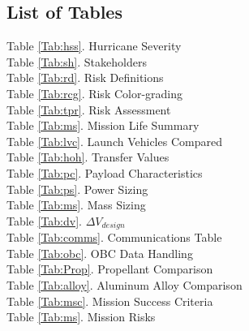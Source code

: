 \subsection{List of Tables}
Table \ref{Tab:hss}. Hurricane Severity\\
Table \ref{Tab:sh}. Stakeholders\\
Table \ref{Tab:rd}. Risk Definitions\\
Table \ref{Tab:rcg}. Risk Color-grading\\
Table \ref{Tab:tpr}. Risk Assessment\\
Table \ref{Tab:ms}. Mission Life Summary\\
Table \ref{Tab:lvc}. Launch Vehicles Compared\\
Table \ref{Tab:hoh}. Transfer Values\\
Table \ref{Tab:pc}. Payload Characteristics\\
Table \ref{Tab:ps}. Power Sizing\\
Table \ref{Tab:ms}. Mass Sizing\\
Table \ref{Tab:dv}. $\Delta{V_{design}}$\\
Table \ref{Tab:comms}. Communications Table\\
Table \ref{Tab:obc}. OBC Data Handling\\
Table \ref{Tab:Prop}. Propellant Comparison\\
Table \ref{Tab:alloy}. Aluminum Alloy Comparison\\
Table \ref{Tab:msc}. Mission Success Criteria\\
Table \ref{Tab:ms}. Mission Risks\\

